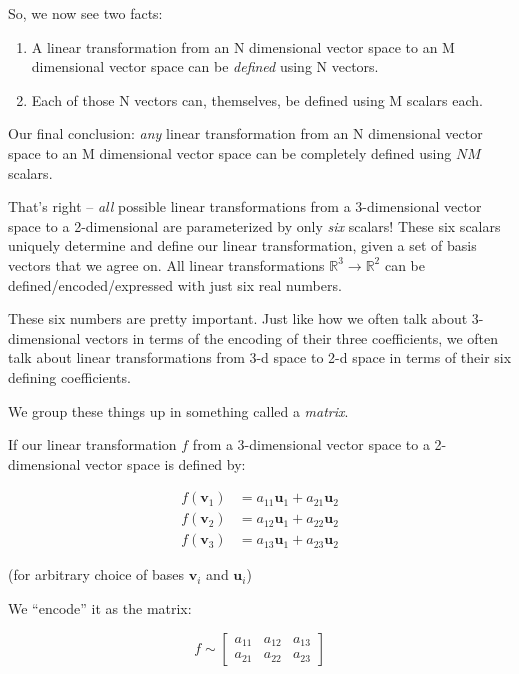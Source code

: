 \documentclass[]{article}
\begin{document}
So, we now see two facts:

\begin{enumerate}
\def\labelenumi{\arabic{enumi}.}
\tightlist
\item
  A linear transformation from an N dimensional vector space to an M dimensional
  vector space can be \emph{defined} using N vectors.
\item
  Each of those N vectors can, themselves, be defined using M scalars each.
\end{enumerate}

Our final conclusion: \emph{any} linear transformation from an N dimensional
vector space to an M dimensional vector space can be completely defined using
\(N M\) scalars.

That's right -- \emph{all} possible linear transformations from a 3-dimensional
vector space to a 2-dimensional are parameterized by only \emph{six} scalars!
These six scalars uniquely determine and define our linear transformation, given
a set of basis vectors that we agree on. All linear transformations
\(\mathbb{R}^3 \rightarrow \mathbb{R}^2\) can be defined/encoded/expressed with
just six real numbers.

These six numbers are pretty important. Just like how we often talk about
3-dimensional vectors in terms of the encoding of their three coefficients, we
often talk about linear transformations from 3-d space to 2-d space in terms of
their six defining coefficients.

We group these things up in something called a \emph{matrix}.

If our linear transformation \(f\) from a 3-dimensional vector space to a
2-dimensional vector space is defined by:

\[
\begin{aligned}
f(\mathbf{v}_1) & = a_{11} \mathbf{u}_1 + a_{21} \mathbf{u}_2 \\
f(\mathbf{v}_2) & = a_{12} \mathbf{u}_1 + a_{22} \mathbf{u}_2 \\
f(\mathbf{v}_3) & = a_{13} \mathbf{u}_1 + a_{23} \mathbf{u}_2
\end{aligned}
\]

(for arbitrary choice of bases \(\mathbf{v}_i\) and \(\mathbf{u}_i\))

We ``encode'' it as the matrix:

\[
f
\sim
\begin{bmatrix}
a_{11} & a_{12} & a_{13} \\
a_{21} & a_{22} & a_{23}
\end{bmatrix}
\]
\end{document}
